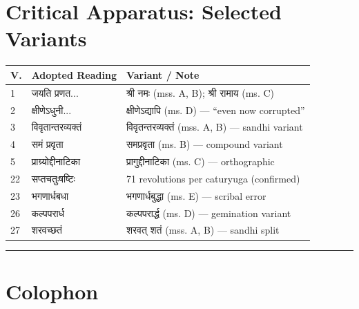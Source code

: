 \documentclass[11pt,a4paper]{article}
\newcommand{\longline}{\noindent\rule{\textwidth}{0.4pt}}
\newcommand{\dev}[1]{{\devanagarifont #1}}
\theoremstyle{definition}
\begin{document}
\vspace{0.8cm}

\section*{Critical Apparatus: Selected Variants}

\begin{longtable}{p{}p{}p{}}
\toprule
\textbf{V.} & \textbf{Adopted Reading} & \textbf{Variant / Note} \\
\midrule
\endhead
1 & \dev{जयति प्रणत...} & \dev{श्री नमः} (mss. A, B); \dev{श्री रामाय} (ms. C) \\
2 & \dev{क्षीणेऽधुनी...} & \dev{क्षीणेऽद्यापि} (ms. D) --- ``even now corrupted'' \\
3 & \dev{विवृतान्तरव्यक्तं} & \dev{विवृतन्तरव्यक्तं} (mss. A, B) --- sandhi variant \\
4 & \dev{समं प्रवृता} & \dev{समप्रवृता} (ms. B) --- compound variant \\
5 & \dev{प्राग्र्योद्दीनाटिका} & \dev{प्रागुद्दीनाटिका} (ms. C) --- orthographic \\
22 & \dev{सप्तचतुःषष्टिः} & 71 revolutions per caturyuga (confirmed) \\
23 & \dev{भगणार्धबधा} & \dev{भगणार्धबुद्धा} (ms. E) --- scribal error \\
26 & \dev{कल्पपरार्ध} & \dev{कल्पपरार्द्ध} (ms. D) --- gemination variant \\
27 & \dev{शरवच्छतं} & \dev{शरवत् शतं} (mss. A, B) --- sandhi split \\
\bottomrule
\end{longtable}

\longline

\newpage
\section*{Colophon}
\end{document}
